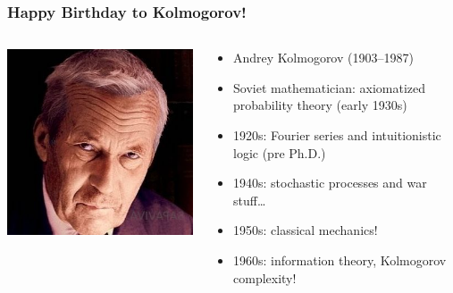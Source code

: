 \begin{frame}
  \frametitle{Happy Birthday to Kolmogorov!}

  \begin{columns}
    \begin{column}{.35\textwidth}
      \includegraphics[height=.6\textheight]{../assets/Kolmogorov}
    \end{column}
    \begin{column}{.7\textwidth}
      \begin{itemize}[<+->]
        \item Andrey Kolmogorov (1903--1987)
                
        \item Soviet mathematician: axiomatized probability theory (early 1930s) 
        
        \item 1920s: Fourier series and intuitionistic logic (pre Ph.D.)
        
        \item 1940s: stochastic processes and war stuff\dots
        
        \item 1950s: classical mechanics! 
        
        \item 1960s: information theory, Kolmogorov complexity!
     
      \end{itemize}
    \end{column}
  \end{columns}
\end{frame}

